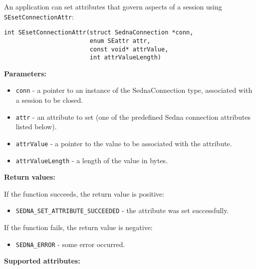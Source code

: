 \documentclass[a4paper,12pt]{article}
\newenvironment{citemize}
{\begin{itemize}
  \setlength{\itemsep}{0pt}
  \setlength{\parskip}{0pt}
  \setlength{\parsep}{0pt}}
{\end{itemize}}
\begin{document}
An application can set attributes that govern aspects of a session using
\verb!SEsetConnectionAttr!:

\begin{verbatim}
int SEsetConnectionAttr(struct SednaConnection *conn,
                        enum SEattr attr,
                        const void* attrValue,
                        int attrValueLength)
\end{verbatim}

\noindent
\textbf{Parameters:}

\begin{citemize}
\item\verb!conn! - a pointer to an instance of the SednaConnection type,
associated with a session to be closed.
\item\verb!attr! - an attribute to set (one of the predefined Sedna connection
attributes listed below).
\item\verb!attrValue! - a pointer to the value to be associated with the
attribute.
\item\verb!attrValueLength! - a length of the value in bytes.
\end{citemize}

\noindent
\textbf{Return values:}

\medskip

\noindent
If the function succeeds, the return value is positive:

\begin{citemize}
\item\verb!SEDNA_SET_ATTRIBUTE_SUCCEEDED! - the attribute was set successfully.
\end{citemize}

\noindent
If the function fails, the return value is negative:

\begin{citemize}
\item\verb!SEDNA_ERROR! - some error occurred.
\end{citemize}

\medskip

\noindent
\textbf{Supported attributes:}
\end{document}
